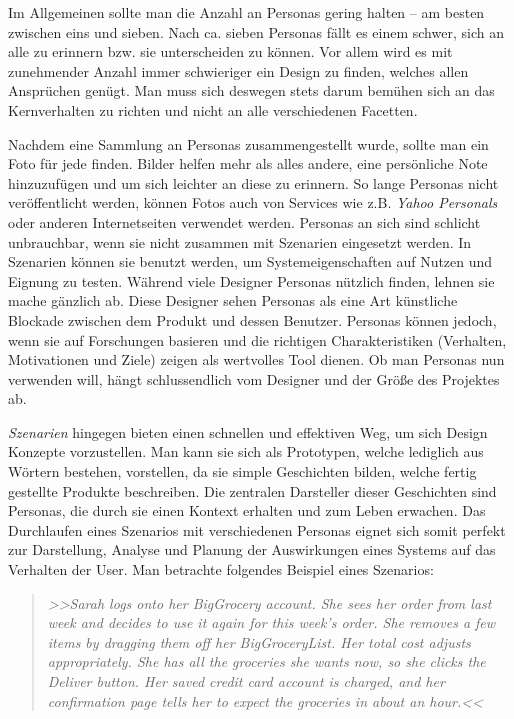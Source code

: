 \medskip Im Allgemeinen sollte man die Anzahl an Personas gering halten – am besten zwischen eins und sieben. Nach ca. sieben Personas fällt es einem schwer, sich an alle zu erinnern bzw. sie unterscheiden zu können. Vor allem wird es mit zunehmender Anzahl immer schwieriger ein Design zu finden, welches allen Ansprüchen genügt. Man muss sich deswegen stets darum bemühen sich an das Kernverhalten zu richten und nicht an alle verschiedenen Facetten.

\medskip Nachdem eine Sammlung an Personas zusammengestellt wurde, sollte man ein Foto für jede finden. Bilder helfen mehr als alles andere, eine persönliche Note hinzuzufügen und um sich leichter an diese zu erinnern. So lange Personas nicht veröffentlicht werden, können Fotos auch von Services wie z.B. \emph{Yahoo Personals} oder anderen Internetseiten verwendet werden. Personas an sich sind schlicht unbrauchbar, wenn sie nicht zusammen mit Szenarien eingesetzt werden. In Szenarien können sie benutzt werden, um Systemeigenschaften auf Nutzen und Eignung zu testen. 
Während viele Designer Personas nützlich finden, lehnen sie mache gänzlich ab. Diese Designer sehen Personas als eine Art künstliche Blockade zwischen dem Produkt und dessen Benutzer. Personas können jedoch, wenn sie auf Forschungen basieren und die richtigen Charakteristiken (Verhalten, Motivationen und Ziele) zeigen als wertvolles Tool dienen. Ob man Personas nun verwenden will, hängt schlussendlich vom Designer und der Größe des Projektes ab. \citep{Saffer:2007}

\medskip \emph{Szenarien} hingegen bieten einen schnellen und effektiven Weg, um sich Design Konzepte vorzustellen. Man kann sie sich als Prototypen, welche lediglich aus Wörtern bestehen, vorstellen, da sie simple Geschichten bilden, welche fertig gestellte Produkte beschreiben. Die zentralen Darsteller dieser Geschichten sind Personas, die durch sie einen Kontext erhalten und zum Leben erwachen. Das Durchlaufen eines Szenarios mit verschiedenen Personas eignet sich somit perfekt zur Darstellung, Analyse und Planung der Auswirkungen eines Systems auf das Verhalten der User. Man betrachte folgendes Beispiel eines Szenarios:

\begin{quote}
	\textsl{>>Sarah logs onto her BigGrocery account. She sees her order from last week and decides to use it again for this week's order. She removes a few items by dragging them off her BigGroceryList. Her total cost adjusts appropriately. She has all the groceries she wants now, so she clicks the Deliver button. Her saved credit card account is charged, and her confirmation page tells her to expect the groceries in about an hour.<<}
	 \begin{flushright} \citep{Saffer:2007} \end{flushright}
\end{quote}

